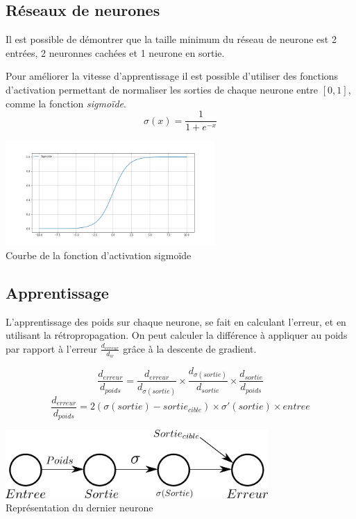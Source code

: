 \documentclass[12pt,a4paper, french]{article}
\begin{document}
\subsection{Réseaux de neurones}
Il est possible de démontrer que la taille minimum du réseau de neurone est 2 entrées, 2 neuronnes cachées et 1 neurone en sortie.  

Pour améliorer la vitesse d'apprentissage il est possible d'utiliser des fonctions d'activation permettant de normaliser les sorties de chaque neurone entre $[0, 1]$, comme la fonction \textit{sigmoïde}.
\begin{equation}
	\sigma(x) = \frac{1}{1+e^{-x}}
\end{equation}

\begin{center}
    \includegraphics[height=4cm]{1-trace sigmoid.jpg} \\
    Courbe de la fonction d'activation sigmoïde
\end{center}


\subsection{Apprentissage}
L'apprentissage des poids sur chaque neurone, se fait en calculant l'erreur, et en utilisant la rétropropagation. On peut calculer la différence à appliquer au poids par rapport à l'erreur $\frac{d_{erreur}}{d_w}$ grâce à la descente de gradient.

\begin{equation}
	\frac{d_{erreur}}{d_{poids}} = 
		\frac{d_{erreur}}{d_{\sigma(sortie)}} 
		\times 
		\frac{d_{\sigma(sortie)}}{d_{sortie}} 
		\times 
		\frac{d_{sortie}}{d_{poids}}   
\end{equation}
\begin{equation}
	\frac{d_{erreur}}{d_{poids}} = 
		2(\sigma(sortie) - sortie_{cible})
		\times 
		\sigma'(sortie)
		\times 
		entree  
\end{equation}

\begin{center}
    \includegraphics[width=10cm]{1-Neuronne backpropagation.png} \\
    Représentation du dernier neurone
\end{center}
\end{document}
